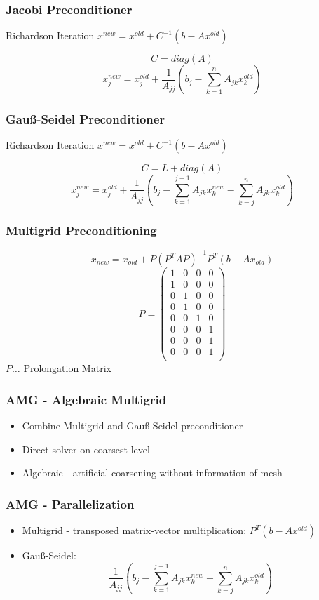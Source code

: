 \documentclass{beamer}
\begin{document}
\begin{frame}
\frametitle{Jacobi Preconditioner}
\begin{block}{Richardson Iteration}
$x^{new} = x^{old} + C^{-1} (b - Ax^{old})$
\end{block}
$$C = diag(A)$$
$$x_j^{new} = x_j^{old} + \frac{1}{A_{jj}} \left(b_{j} -
\sum_{k=1}^{n} A_{jk} x_k^{old}\right)$$
\end{frame}

\begin{frame}
\frametitle{Gau\ss-Seidel Preconditioner}
\begin{block}{Richardson Iteration}
$x^{new} = x^{old} + C^{-1} (b - Ax^{old})$
\end{block}
$$C = L + diag(A)$$
$$x_j^{new} = x_j^{old} + \frac{1}{A_{jj}} \left(b_{j} - \sum_{k=1}^{j-1} A_{jk}
x_k^{new} - \sum_{k=j}^{n} A_{jk} x_k^{old}\right)$$
\end{frame}

\begin{frame}
\frametitle{Multigrid Preconditioning}
$$x_{new} = x_{old} + P (P^{T} A P)^{-1} P^{T} (b - A x_{old})$$
$$P =
\begin{pmatrix}
  1 & 0 & 0 & 0 \\
  1 & 0 & 0 & 0 \\
  0 & 1 & 0 & 0 \\
  0 & 1 & 0 & 0 \\
  0 & 0 & 1 & 0 \\
  0 & 0 & 0 & 1 \\
  0 & 0 & 0 & 1 \\
  0 & 0 & 0 & 1 \\
\end{pmatrix}
$$
$P \dots$ Prolongation Matrix
\end{frame}

\begin{frame}
\frametitle{AMG - Algebraic Multigrid}
\begin{itemize}
  \item Combine Multigrid and Gau\ss-Seidel preconditioner
  \item Direct solver on coarsest level
  \item Algebraic - artificial coarsening without information of mesh
\end{itemize}
\end{frame}

\begin{frame}
\frametitle{AMG - Parallelization}
\begin{itemize}
  \item Multigrid - transposed matrix-vector multiplication:
    $P^{T} (b-Ax^{old})$
  \item Gau\ss-Seidel: \\ $$\frac{1}{A_{jj}} \left(b_{j} - \sum_{k=1}^{j-1} A_{jk}
x_k^{new} - \sum_{k=j}^{n} A_{jk} x_k^{old}\right)$$
\end{itemize}
\end{frame}
\end{document}
